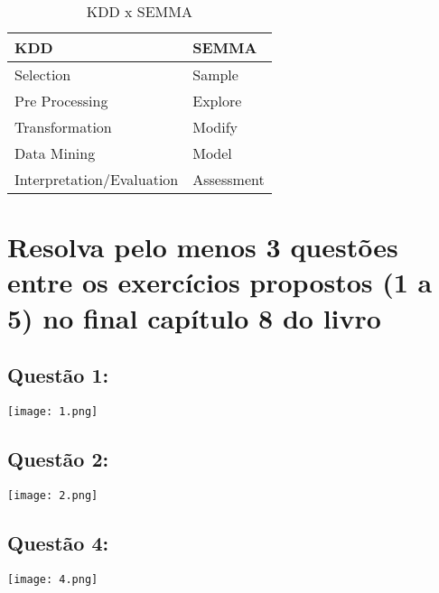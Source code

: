 \documentclass{article}
\begin{document}
\begin{table}[h]
\centering
\caption{KDD x SEMMA}
\label{kdd-vs-semma}
\begin{tabular}{|l|l|}
\hline
KDD                       & SEMMA      \\ \hline
Selection                 & Sample     \\ \hline
Pre Processing            & Explore    \\ \hline
Transformation            & Modify     \\ \hline
Data Mining               & Model      \\ \hline
Interpretation/Evaluation & Assessment \\ \hline
\end{tabular}
\end{table}

\section{Resolva pelo menos 3 questões entre os exercícios propostos (1 a 5) no final capítulo 8 do livro}
\subsection{Questão 1:}
\texttt{[image: 1.png]}
\newpage
\subsection{Questão 2:}
\texttt{[image: 2.png]}
\subsection{Questão 4:}
\texttt{[image: 4.png]}
\end{document}
